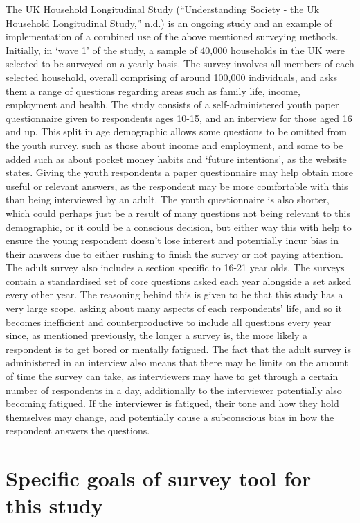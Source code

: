 \documentclass[
  11pt,
]{book}
\begin{document}
The UK Household Longitudinal Study (``Understanding Society - the Uk
Household Longitudinal Study,''
\protect\hyperlink{ref-longitudinal}{n.d.}) is an ongoing study and an
example of implementation of a combined use of the above mentioned
surveying methods. Initially, in `wave 1' of the study, a sample of
40,000 households in the UK were selected to be surveyed on a yearly
basis. The survey involves all members of each selected household,
overall comprising of around 100,000 individuals, and asks them a range
of questions regarding areas such as family life, income, employment and
health. The study consists of a self-administered youth paper
questionnaire given to respondents ages 10-15, and an interview for
those aged 16 and up. This split in age demographic allows some
questions to be omitted from the youth survey, such as those about
income and employment, and some to be added such as about pocket money
habits and `future intentions', as the website states. Giving the youth
respondents a paper questionnaire may help obtain more useful or
relevant answers, as the respondent may be more comfortable with this
than being interviewed by an adult. The youth questionnaire is also
shorter, which could perhaps just be a result of many questions not
being relevant to this demographic, or it could be a conscious decision,
but either way this with help to ensure the young respondent doesn't
lose interest and potentially incur bias in their answers due to either
rushing to finish the survey or not paying attention. The adult survey
also includes a section specific to 16-21 year olds. The surveys contain
a standardised set of core questions asked each year alongside a set
asked every other year. The reasoning behind this is given to be that
this study has a very large scope, asking about many aspects of each
respondents' life, and so it becomes inefficient and counterproductive
to include all questions every year since, as mentioned previously, the
longer a survey is, the more likely a respondent is to get bored or
mentally fatigued. The fact that the adult survey is administered in an
interview also means that there may be limits on the amount of time the
survey can take, as interviewers may have to get through a certain
number of respondents in a day, additionally to the interviewer
potentially also becoming fatigued. If the interviewer is fatigued,
their tone and how they hold themselves may change, and potentially
cause a subconscious bias in how the respondent answers the questions.

\section{Specific goals of survey tool for this study}
\end{document}
